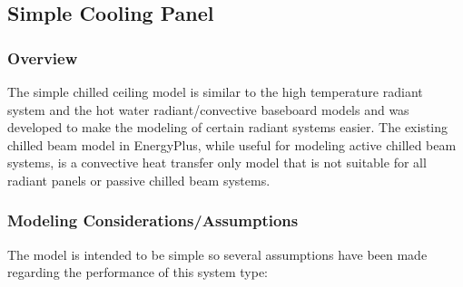 \subsection{Simple Cooling Panel}\label{simple-cooling-panel}

\subsubsection{Overview}\label{overview}

The simple chilled ceiling model is similar to the high temperature radiant system and the hot water radiant/convective baseboard models and was developed to make the modeling of certain radiant systems easier.  The existing chilled beam model in EnergyPlus, while useful for modeling active chilled beam systems, is a convective heat transfer only model that is not suitable for all radiant panels or passive chilled beam systems.

\subsubsection{Modeling Considerations/Assumptions}\label{modeling-considerations-assumptions}

The model is intended to be simple so several assumptions have been made regarding the performance of this system type:

